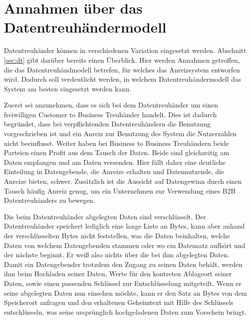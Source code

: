 \documentclass[
	fontsize=12pt,
	headings=small,
	parskip=half,           %
	bibliography=totoc,
	numbers=noenddot,       %
	open=any,               %
]{scrreprt}
\begin{document}
\section{Annahmen über das Datentreuhändermodell}
\label{sec:systemAssumptions}
Datentreuhänder können in verschiedenen Variation eingesetzt werden. Abschnitt \ref{sec:dt} gibt darüber bereits einen Überblick. Hier werden Annahmen getroffen, die das Datentreuhändmodell betrefen, für welches das Anreizsystem entworfen wird. Dadurch soll verdeutlicht werden, in welchem Datentreuhändermodell das System am besten eingesetzt werden kann.

Zuerst sei anzunehmen, dass es sich bei dem Datentreuhänder um einen freiwilligen Customer to Business Treuhänder handelt. Dies ist dadurch begründet, dass bei verpflichtenden Datentreuhändern die Benutzung vorgeschrieben ist und ein Anreiz zur Benutzung des System die Nutzerzahlen nicht beeinflusst. Weiter haben bei Business to Business Treuhändern beide Parteien einen Profit aus dem Tausch der Daten. Beide sind gleichzeitig am Daten empfangen und am Daten versenden. Hier fällt daher eine deutliche Einteilung in Datengebende, die Anreize erhalten und Datennutzende, die Anreize bieten, schwer. Zusätzlich ist die Aussicht auf Datengewinn durch einen Tausch häufig Anreiz genug, um ein Unternehmen zur Verwendung eines B2B Datentreuhänders zu bewegen. 

Die beim Datentreuhänder abgelegten Daten sind verschlüsselt. Der Datentreuhänder speichert lediglich eine lange Liste an Bytes, kann aber anhand der verschlüsselten Bytes nicht feststellen, was die Daten beinhalten, welche Daten von welchem Datengebenden stammen oder wo ein Datensatz aufhört und der nächste beginnt. Er weiß also nichts über die bei ihm abgelegten Daten. Damit ein Datengebender trotzdem den Zugang zu seinen Daten behält, werden ihm beim Hochladen seiner Daten, Werte für den kontreten Ablageort seiner Daten, sowie einen passenden Schlüssel zur Entschlüsselung mitgeteilt. Wenn er seine abgelegten Daten nun einsehen möchte, kann er den Satz an Bytes von dem Speicherort anfragen und den erhaltenen Geheimtext mit Hilfe des Schlüssels entschlüsseln, was seine ursprünglich hochgeladenen Daten zum Vorschein bringt.
\end{document}
